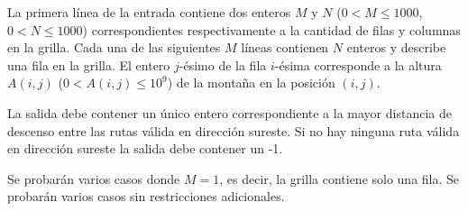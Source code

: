 \documentclass{oci}
\begin{document}
\begin{inputDescription}
La primera línea de la entrada contiene dos enteros $M$ y $N$ ($0 < M \leq 1000$, $0 < N \leq 1000$)
correspondientes respectivamente a la cantidad de filas y columnas en la grilla.
Cada una de las siguientes $M$ líneas contienen $N$ enteros y describe una fila en la grilla.
El entero $j$-ésimo de la fila $i$-ésima corresponde a la altura $A(i,j)$ ($ 0 < A(i, j) \leq 10^9$)
de la montaña en la posición $(i,j)$.
\end{inputDescription}

\begin{outputDescription}
La salida debe contener un único entero correspondiente a la mayor distancia de descenso entre las
rutas válida en dirección sureste.
Si no hay ninguna ruta válida en dirección sureste la salida debe contener un -1.
\end{outputDescription}

\begin{scoreDescription}
  Se probarán varios casos donde $M=1$, es decir, la grilla contiene solo una fila.
  Se probarán varios casos sin restricciones adicionales.
\end{scoreDescription}

\begin{sampleDescription}
\end{sampleDescription}
\end{document}
